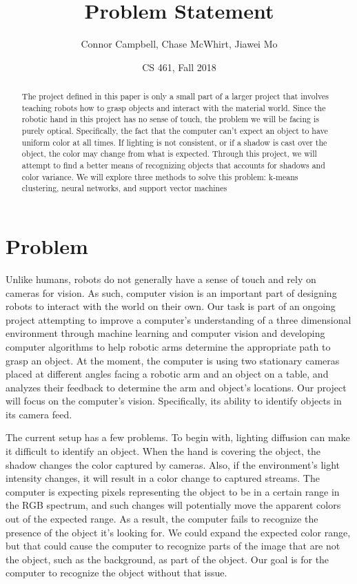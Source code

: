 \documentclass{article}
\title{Problem Statement}
\author{Connor Campbell, Chase McWhirt, Jiawei Mo}
\date{CS 461, Fall 2018}
\begin{document}
\maketitle

\begin{abstract}
The project defined in this paper is only a small part of a larger project that involves teaching robots how to grasp objects and interact with the material world.
Since the robotic hand in this project has no sense of touch, the problem we will be facing is purely optical.
Specifically, the fact that the computer can't expect an object to have uniform color at all times.
If lighting is not consistent, or if a shadow is cast over the object, the color may change from what is expected.
Through this project, we will attempt to find a better means of recognizing objects that accounts for shadows and color variance.
We will explore three methods to solve this problem: k-means clustering, neural networks, and support vector machines

\end{abstract}

\newpage

\section{Problem}
Unlike humans, robots do not generally have a sense of touch and rely on cameras for vision.
As such, computer vision is an important part of designing robots to interact with the world on their own.
Our task is part of an ongoing project attempting to improve a computer’s understanding of a three
dimensional environment through machine learning and computer vision and developing computer algorithms
to help robotic arms determine the appropriate path to grasp an object.
At the moment, the computer is using two stationary cameras placed at different angles facing a robotic arm
and an object on a table, and analyzes their feedback to determine the arm and object's locations.
Our project will focus on the computer's vision. Specifically, its ability to identify objects in its camera feed. \newline

\noindent
The current setup has a few problems.
To begin with, lighting diffusion can make it difficult to identify an object.
When the hand is covering the object, the shadow changes the color captured by cameras.
Also, if the environment's light intensity changes, it will result in a color change to captured streams.
The computer is expecting pixels representing the object to be in a certain range in the RGB spectrum,
and such changes will potentially move the apparent colors out of the expected range.
As a result, the computer fails to recognize the presence of the object it’s looking for.
We could expand the expected color range, but that could cause the computer to recognize parts of the
image that are not the object, such as the background, as part of the object.
Our goal is for the computer to recognize the object without that issue.
\end{document}
